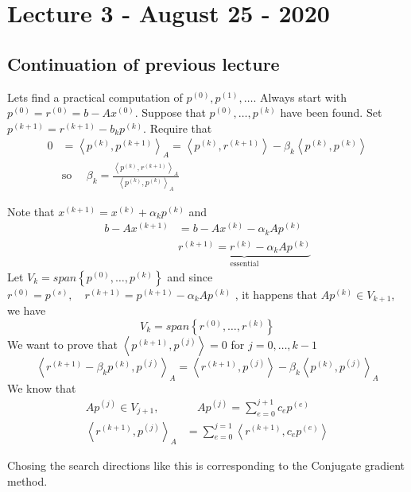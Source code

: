 \documentclass{article}
\theoremstyle{remark}
\begin{document}
\newpage
\section{Lecture 3 -  August 25 - 2020}%
\label{sec:lecture_3}

\subsection{Continuation of previous lecture}%
\label{sub:contiouation_of_previous_lecture}


 Lets find a practical computation of $p^{(0)}, p^{(1)}, \ldots$. Always start with $p^{(0)} = r^{(0)} = b -Ax^{(0)}$. Suppose that $p^{(0)}, \ldots , p^{(k)}$ have been found. Set $p^{(k+1)} = r^{(k+1)} - b_{k} p ^{(k)}$. Require that \[
   \begin{split}
 0 &=   \left<p^{(k)} , p^{(k+1)} \right> _{A} = \left< p^{(k)}, r^{(k+1)}   \right> - \beta _{k} \left<p^{(k)} , p^{(k)} \right> \\
   &  \text{so } \quad  \beta _{k} =  \frac{\left<p^{(k)} , r^{(k+1)} \right> _{A}}{ \left<p^{(k)} , p^{(k)} \right>_{A}}     
   \end{split} 
 \] 

 Note that $x^{(k+1)} = x^{(k)} + \alpha _{k} p^{(k)} $  and \[
   \begin{split}
 b -Ax^{(k+1)} &=   b - Ax^{(k)} - \alpha _{k} Ap^{(k)} \\
  &  \underbrace{r^{(k+1)} =   r^{(k)} - \alpha  _{k} Ap^{(k)}}_\text{essential} 
   \end{split} 
 \] 
 Let $V_{k} = span \left\{ p^{(0)} , \ldots, p^{(k)} \right\}$ and since $r^{(0)} = p^{(s)}, \quad r^{(k+1)} = p ^{(k+1)} - \alpha _{k} A p^{(k)}   $ , it happens that $Ap^{(k)} \in  V_{k+1}$, we have \[
   V_{k} = span \left\{ r^{(0)} , \ldots, r^{(k)} \right\}
 \] 
 We want to prove that $\left<p^{(k+1)} , p^{(j)} \right> = 0 $ for $j = 0, \ldots, k-1$ \[
   \left<r^{(k+1)}- \beta _{k} p^{(k)} , p^{(j)} \right> _{A} = \left<r^{(k+1)}, p^{(j)} \right> - \beta _{k}\left< p^{(k)} , p^{(j)} \right>_{A}
 \] 
 We know that \[
   \begin{split}
 Ap^{(j)} \in  V_{j+1} , &  \quad  A p^{(j)} = \sum_{e=0}^{j +1}  c_{e} p^{(e)}  \\
 \left<r^{(k+1)} , p^{(j)}  \right> _{A} &=  \sum_{e = 0}^{ j=1 }  \left<r^{(k+1)}, c_{e}p^{(e)} \right> 
   \end{split} 
 \] 

 Chosing the search directions like this is corresponding to the Conjugate gradient method. 
\end{document}
